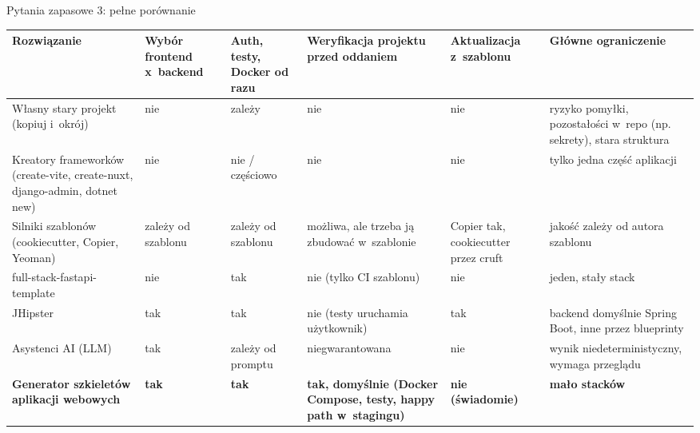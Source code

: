 \documentclass[aspectratio=169, 11pt]{beamer}
\newcommand{\rowrule}{\specialrule{0.3pt}{1.5pt}{1.5pt}}
\begin{document}
\begin{frame}{Pytania zapasowe 3: pełne porównanie}
  \tiny
  \setlength{\tabcolsep}{3pt}
  \begin{adjustbox}{max width=1.08\textwidth, max totalheight=0.85\textheight, center}
  \begin{tabularx}{1.08\textwidth}{>{\raggedright\arraybackslash}p{2.6cm} *{4}{>{\raggedright\arraybackslash}X} >{\raggedright\arraybackslash}p{3.0cm}}
    \toprule
    Rozwiązanie & Wybór frontend x~backend & Auth, testy, Docker od razu & Weryfikacja projektu przed oddaniem & Aktualizacja z~szablonu & Główne ograniczenie \\
    \midrule
    Własny stary projekt (kopiuj i~okrój) & nie & zależy & nie & nie & ryzyko pomyłki, pozostałości w~repo (np. sekrety), stara struktura \\
    \rowrule
    Kreatory frameworków (create-vite, create-nuxt, django-admin, dotnet new) & nie & nie / częściowo & nie & nie & tylko jedna część aplikacji \\
    \rowrule
    Silniki szablonów (cookiecutter, Copier, Yeoman) & zależy od szablonu & zależy od szablonu & możliwa, ale trzeba ją zbudować w~szablonie & Copier tak, cookiecutter przez cruft & jakość zależy od autora szablonu \\
    \rowrule
    full-stack-fastapi-template & nie & tak & nie (tylko CI szablonu) & nie & jeden, stały stack \\
    \rowrule
    JHipster & tak & tak & nie (testy uruchamia użytkownik) & tak & backend domyślnie Spring Boot, inne przez blueprinty \\
    \rowrule
    Asystenci AI (LLM) & tak & zależy od promptu & niegwarantowana & nie & wynik niedeterministyczny, wymaga przeglądu \\
    \midrule
    \textbf{Generator szkieletów aplikacji webowych} & \textbf{tak} & \textbf{tak} & \textbf{tak, domyślnie (Docker Compose, testy, happy path w~stagingu)} & \textbf{nie (świadomie)} & \textbf{mało stacków} \\
    \bottomrule
  \end{tabularx}
  \end{adjustbox}
\end{frame}
\end{document}
